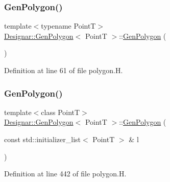 \subsubsection{\texorpdfstring{Gen\+Polygon()}{GenPolygon()}\hspace{0.1cm}{\footnotesize\ttfamily [1/4]}}
{\footnotesize\ttfamily template$<$typename PointT$>$ \\
\hyperlink{class_designar_1_1_gen_polygon}{Designar\+::\+Gen\+Polygon}$<$ PointT $>$\+::\hyperlink{class_designar_1_1_gen_polygon}{Gen\+Polygon} (\begin{DoxyParamCaption}{ }\end{DoxyParamCaption})\hspace{0.3cm}{\ttfamily [inline]}}



Definition at line 61 of file polygon.\+H.

\mbox{\label{class_designar_1_1_gen_polygon_ac5ac34d76225f9c1d8895753f9e22ae8}} 
\subsubsection{\texorpdfstring{Gen\+Polygon()}{GenPolygon()}\hspace{0.1cm}{\footnotesize\ttfamily [2/4]}}
{\footnotesize\ttfamily template$<$class PointT$>$ \\
\hyperlink{class_designar_1_1_gen_polygon}{Designar\+::\+Gen\+Polygon}$<$ PointT $>$\+::\hyperlink{class_designar_1_1_gen_polygon}{Gen\+Polygon} (\begin{DoxyParamCaption}\item[{const std\+::initializer\+\_\+list$<$ PointT $>$ \&}]{l }\end{DoxyParamCaption})}



Definition at line 442 of file polygon.\+H.

\mbox{\label{class_designar_1_1_gen_polygon_a8dd52177ce8635fb198a12cc62bdb44f}} 
